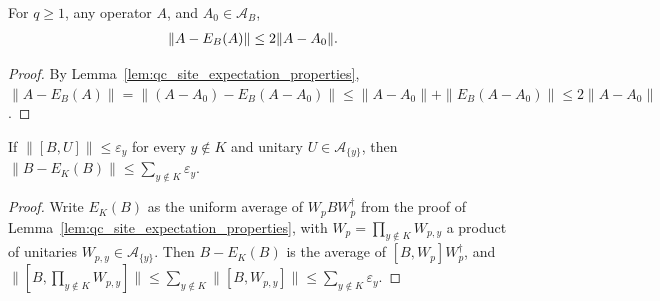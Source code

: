 \begin{lemma}
    \label{thm:qc_site_expectation_supported_approximant}
    \leanok
    For $q\ge1$, any operator $A$, and $A_0\in\mathcal A_B$,
    \begin{align}
        \|A-E_B(A)\| & \le2\|A-A_0\|.\notag
    \end{align}
\end{lemma}
\begin{proof}\leanok
    By Lemma~\ref{lem:qc_site_expectation_properties}, $\|A-E_B(A)\|=\|(A-A_0)-E_B(A-A_0)\|\le\|A-A_0\|+\|E_B(A-A_0)\|\le2\|A-A_0\|$.
\end{proof}

\begin{lemma}
    \label{lem:qc_site_expectation_commutator}
    \leanok
    If $\|[B,U]\|\leq\varepsilon_y$ for every $y\notin K$ and unitary $U\in\mathcal A_{\{y\}}$, then $\|B-E_K(B)\|\leq\sum_{y\notin K}\varepsilon_y$.
\end{lemma}
\begin{proof}\leanok
    Write $E_K(B)$ as the uniform average of $W_pBW_p^\dagger$ from the proof of Lemma~\ref{lem:qc_site_expectation_properties}, with $W_p=\prod_{y\notin K}W_{p,y}$ a product of unitaries $W_{p,y}\in\mathcal A_{\{y\}}$. Then $B-E_K(B)$ is the average of $[B,W_p]W_p^\dagger$, and $\|[B,\prod_{y\notin K}W_{p,y}]\|\le\sum_{y\notin K}\|[B,W_{p,y}]\|\le\sum_{y\notin K}\varepsilon_y$.
\end{proof}

